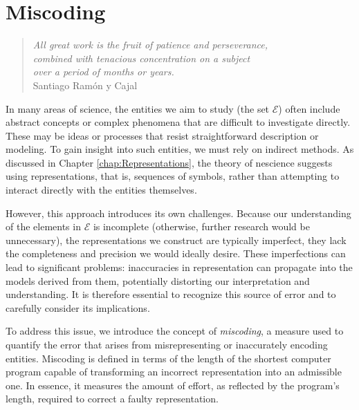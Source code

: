 %
%


\chapter{Miscoding}
\label{chap:Miscoding}

\begin{quote}
    \begin{flushright}
        \emph{All great work is the fruit of patience and perseverance,\\
            combined with tenacious concentration on a subject\\
            over a period of months or years.}\\
        Santiago Ramón y Cajal
    \end{flushright}
\end{quote}
\bigskip

In many areas of science, the entities we aim to study (the set $\mathcal{E}$) often include abstract concepts or complex phenomena that are difficult to investigate directly. These may be ideas or processes that resist straightforward description or modeling. To gain insight into such entities, we must rely on indirect methods. As discussed in Chapter \ref{chap:Representations}, the theory of nescience suggests using representations, that is, sequences of symbols, rather than attempting to interact directly with the entities themselves.

However, this approach introduces its own challenges. Because our understanding of the elements in $\mathcal{E}$ is incomplete (otherwise, further research would be unnecessary), the representations we construct are typically imperfect, they lack the completeness and precision we would ideally desire. These imperfections can lead to significant problems: inaccuracies in representation can propagate into the models derived from them, potentially distorting our interpretation and understanding. It is therefore essential to recognize this source of error and to carefully consider its implications.

To address this issue, we introduce the concept of \emph{miscoding}, a measure used to quantify the error that arises from misrepresenting or inaccurately encoding entities. Miscoding is defined in terms of the length of the shortest computer program capable of transforming an incorrect representation into an admissible one. In essence, it measures the amount of effort, as reflected by the program's length, required to correct a faulty representation.

